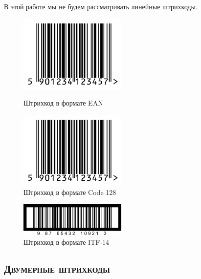 В этой работе мы не будем рассматривать линейные штрихкоды.

\begin{figure}[h]
    \begin{multicols}{2}
 
        \begin{center}
             \includegraphics[scale=0.5]{img/ean_sample} 
             \caption{Штрихкод в формате EAN}
             \label{fig:ean}
        \end{center}
   
        \begin{center}
            \includegraphics[scale=0.5]{img/ean_sample} 
            \caption{Штрихкод в формате Code 128}
            \label{fig:code128}
        \end{center}       
       
    \end{multicols}
\end{figure}

\begin{figure}[h]
    \centering
    \includegraphics[scale=0.7]{img/itf_sample}
    \caption{Штрихкод в формате ITF-14}
    \label{fig:itf14}
\end{figure}
    
\subsection{\textsc{Двумерные штрихкоды}}

